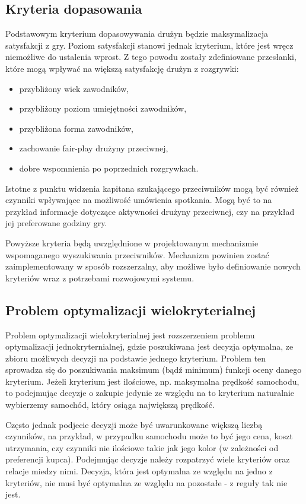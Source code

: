 \subsection{Kryteria dopasowania}

Podstawowym kryterium dopasowywania drużyn będzie maksymalizacja satysfakcji z gry. Poziom satysfakcji stanowi jednak kryterium, które jest wręcz niemożliwe do ustalenia wprost. Z tego powodu zostały zdefiniowane przesłanki, które mogą wpływać na większą satysfakcję drużyn z rozgrywki:

\begin{itemize}
\item{przybliżony wiek zawodników,}
\item{przybliżony poziom umiejętności zawodników,}
\item{przybliżona forma zawodników,}
\item{zachowanie fair-play drużyny przeciwnej,}
\item{dobre wspomnienia po poprzednich rozgrywkach.}
\end{itemize}

Istotne z punktu widzenia kapitana szukającego przeciwników mogą być również czynniki wpływające na możliwość umówienia spotkania. Mogą być to na przykład informacje dotyczące aktywności drużyny przeciwnej, czy na przykład jej preferowane godziny gry.

Powyższe kryteria będą uwzględnione w projektowanym mechanizmie wspomaganego wyszukiwania przeciwników. Mechanizm powinien zostać zaimplementowany w sposób rozszerzalny, aby możliwe było definiowanie nowych kryteriów wraz z potrzebami rozwojowymi systemu.

\subsection{Problem optymalizacji wielokryterialnej}

Problem optymalizacji wielokryterialnej jest rozszerzeniem problemu optymalizacji jednokryternialnej, gdzie poszukiwana jest decyzja optymalna, ze zbioru możliwych decyzji na podstawie jednego kryterium. Problem ten sprowadza się do poszukiwania maksimum (bądź minimum) funkcji oceny danego kryterium. Jeżeli kryterium jest ilościowe, np. maksymalna prędkość samochodu, to podejmując decyzje o zakupie jedynie ze względu na to kryterium naturalnie wybierzemy samochód, który osiąga największą prędkość. 

Często jednak podjecie decyzji może być uwarunkowane większą liczbą czynników, na przykład, w przypadku samochodu może to być jego cena, koszt utrzymania, czy czynniki nie ilościowe takie jak jego kolor (w zależności od preferencji kupca). Podejmując decyzje należy rozpatrzyć wiele kryteriów oraz relacje miedzy nimi. Decyzja, która jest optymalna ze względu na jedno z kryteriów, nie musi być optymalna ze względu na pozostałe - z reguły tak nie jest.

